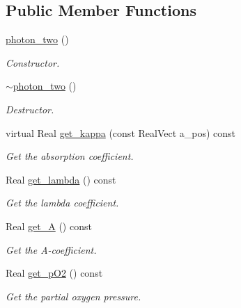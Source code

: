 \subsection*{Public Member Functions}
\begin{DoxyCompactItemize}
\item 
\hyperlink{classair__bolsig_1_1photon__two_ab86f5923286595b84b8d1a3d93cffcfb}{photon\+\_\+two} ()
\begin{DoxyCompactList}\small\item\em Constructor. \end{DoxyCompactList}\item 
\hyperlink{classair__bolsig_1_1photon__two_a6fc1429e63b0161cecdba3769231f8a3}{$\sim$photon\+\_\+two} ()
\begin{DoxyCompactList}\small\item\em Destructor. \end{DoxyCompactList}\item 
virtual Real \hyperlink{classair__bolsig_1_1photon__two_ad1a8ab294692795d8967dae9e707b0f6}{get\+\_\+kappa} (const Real\+Vect a\+\_\+pos) const 
\begin{DoxyCompactList}\small\item\em Get the absorption coefficient. \end{DoxyCompactList}\item 
Real \hyperlink{classair__bolsig_1_1photon__two_aaed13cd20f859c6524ea5ade2718c124}{get\+\_\+lambda} () const 
\begin{DoxyCompactList}\small\item\em Get the lambda coefficient. \end{DoxyCompactList}\item 
Real \hyperlink{classair__bolsig_1_1photon__two_a0bc16ee50d4044c8f7784e3fdf58d56b}{get\+\_\+A} () const 
\begin{DoxyCompactList}\small\item\em Get the A-\/coefficient. \end{DoxyCompactList}\item 
Real \hyperlink{classair__bolsig_1_1photon__two_a512593d33acdef238ee38a95dcc1e354}{get\+\_\+p\+O2} () const 
\begin{DoxyCompactList}\small\item\em Get the partial oxygen pressure. \end{DoxyCompactList}\end{DoxyCompactItemize}
